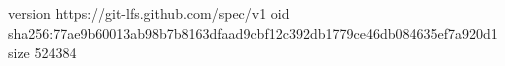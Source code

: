 version https://git-lfs.github.com/spec/v1
oid sha256:77ae9b60013ab98b7b8163dfaad9cbf12c392db1779ce46db084635ef7a920d1
size 524384
